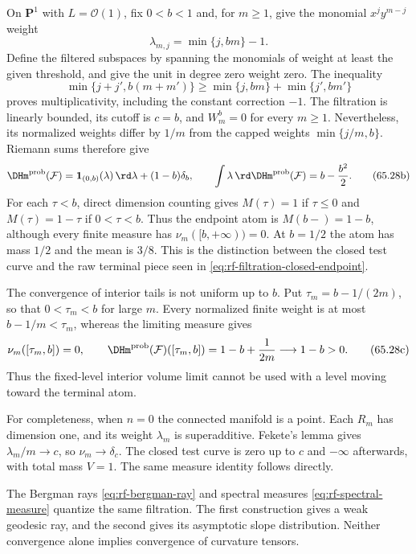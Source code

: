 \noindent\begin{minipage}{\linewidth}
\begin{example}\label{ex:rf-terminal-spectral-atom}
On $\mathbf P^1$ with $L=\mathcal O(1)$, fix $0<b<1$ and, for $m\geq1$, give the monomial $x^jy^{m-j}$ weight
\[
                   \lambda_{m,j}=\min\{j,bm\}-1.
\]
Define the filtered subspaces by spanning the monomials of weight at least the given threshold, and give the unit in degree zero weight zero. The inequality
\[
 \min\{j+j',b(m+m')\}
       \geq\min\{j,bm\}+\min\{j',bm'\}
\]
proves multiplicativity, including the constant correction $-1$. The filtration is linearly bounded, its cutoff is $c=b$, and $W^b_m=0$ for every $m\geq1$. Nevertheless, its normalized weights differ by $1/m$ from the capped weights $\min\{j/m,b\}$. Riemann sums therefore give
\[
 \DHm^{\mathrm{prob}}(\mathcal F)
       =\mathbf 1_{(0,b)}(\lambda)\,\rd\lambda+(1-b)\delta_b,
 \qquad
 \int\lambda\,\rd\DHm^{\mathrm{prob}}(\mathcal F)
       =b-\frac{b^2}{2}.
 \tag{65.28b}\label{eq:rf-terminal-atom-example}
\]
For each $\tau<b$, direct dimension counting gives $M(\tau)=1$ if $\tau\leq0$ and $M(\tau)=1-\tau$ if $0<\tau<b$. Thus the endpoint atom is $M(b-)=1-b$, although every finite measure has $\nu_m([b,+\infty))=0$. At $b=1/2$ the atom has mass $1/2$ and the mean is $3/8$. This is the distinction between the closed test curve and the raw terminal piece seen in \eqref{eq:rf-filtration-closed-endpoint}.

The convergence of interior tails is not uniform up to $b$. Put
$\tau_m=b-1/(2m)$, so that $0<\tau_m<b$ for large $m$. Every normalized
finite weight is at most $b-1/m<\tau_m$, whereas the limiting measure gives
\[
 \nu_m([\tau_m,b])=0,\qquad
 \DHm^{\mathrm{prob}}(\mathcal F)([\tau_m,b])
       =1-b+\frac1{2m}\longrightarrow1-b>0.
\tag{65.28c}\label{eq:rf-moving-terminal-tail}
\]
Thus the fixed-level interior volume limit cannot be used with a level
moving toward the terminal atom.
\end{example}
\end{minipage}\par

For completeness, when $n=0$ the connected manifold is a point. Each $R_m$ has dimension one, and its weight $\lambda_m$ is superadditive. Fekete's lemma gives $\lambda_m/m\to c$, so $\nu_m\to\delta_c$. The closed test curve is zero up to $c$ and $-\infty$ afterwards, with total mass $V=1$. The same measure identity follows directly.

The Bergman rays \eqref{eq:rf-bergman-ray} and spectral measures \eqref{eq:rf-spectral-measure} quantize the same filtration. The first construction gives a weak geodesic ray, and the second gives its asymptotic slope distribution. Neither convergence alone implies convergence of curvature tensors.

